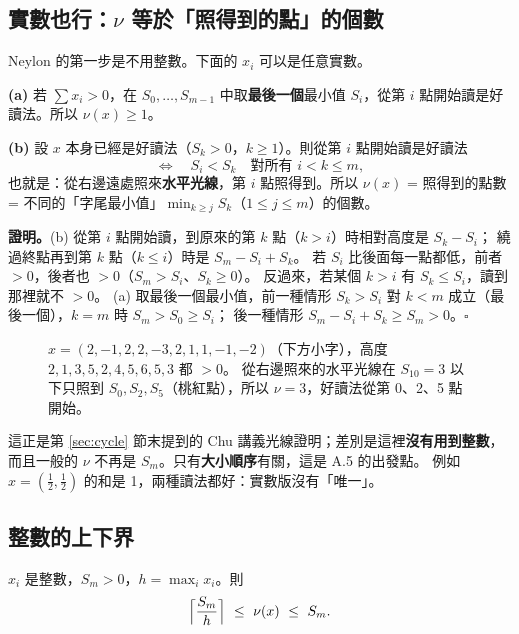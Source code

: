 \subsection{實數也行：$\nu$ 等於「照得到的點」的個數}

Neylon 的第一步是不用整數。下面的 $x_i$ 可以是任意實數。

\begin{thmbox}[性質 3、4（Neylon）]
\textbf{(a)} 若 $\sum x_i>0$，在 $S_0,\ldots,S_{m-1}$ 中取\textbf{最後一個}最小值 $S_i$，從第 $i$ 點開始讀是好讀法。所以 $\nu(x)\ge1$。

\textbf{(b)} 設 $x$ 本身已經是好讀法（$S_k>0$，$k\ge1$）。則從第 $i$ 點開始讀是好讀法
\[
\iff\quad S_i<S_k\quad\text{對所有 } i<k\le m,
\]
也就是：從右邊遠處照來\textbf{水平光線}，第 $i$ 點照得到。所以 $\nu(x)$ = 照得到的點數 = 不同的「字尾最小值」$\min_{k\ge j}S_k$（$1\le j\le m$）的個數。
\end{thmbox}

\textbf{證明。}(b) 從第 $i$ 點開始讀，到原來的第 $k$ 點（$k>i$）時相對高度是 $S_k-S_i$；
繞過終點再到第 $k$ 點（$k\le i$）時是 $S_m-S_i+S_k$。
若 $S_i$ 比後面每一點都低，前者 $>0$，後者也 $>0$（$S_m>S_i$、$S_k\ge0$）。
反過來，若某個 $k>i$ 有 $S_k\le S_i$，讀到那裡就不 $>0$。
(a) 取最後一個最小值，前一種情形 $S_k>S_i$ 對 $k<m$ 成立（最後一個），$k=m$ 時 $S_m>S_0\ge S_i$；
後一種情形 $S_m-S_i+S_k\ge S_m>0$。\hfill$\square$

\begin{figure}[H]
\centering
\RanNeyView
\caption{$x=(2,-1,2,2,-3,2,1,1,-1,-2)$（下方小字），高度 $2,1,3,5,2,4,5,6,5,3$ 都 $>0$。
從右邊照來的水平光線在 $S_{10}=3$ 以下只照到 $S_0,S_2,S_5$（桃紅點），所以 $\nu=3$，好讀法從第 0、2、5 點開始。}
\label{fig:neyview}
\end{figure}

這正是第 \ref{sec:cycle} 節末提到的 Chu 講義光線證明；差別是這裡\textbf{沒有用到整數}，
而且一般的 $\nu$ 不再是 $S_m$。只有\textbf{大小順序}有關，這是 A.5 的出發點。
例如 $x=(\tfrac12,\tfrac12)$ 的和是 1，兩種讀法都好：實數版沒有「唯一」。

\subsection{整數的上下界}

\begin{thmbox}[性質 5（Neylon）]
$x_i$ 是整數，$S_m>0$，$h=\max_i x_i$。則
\[
\Bigl\lceil \frac{S_m}{h}\Bigr\rceil\ \le\ \nu(x)\ \le\ S_m .
\]
\end{thmbox}

